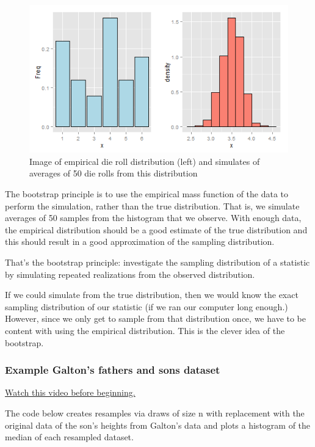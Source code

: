 \documentclass[]{article}
\begin{document}
\begin{figure}[htbp]
\centering
\includegraphics{LeanPub/images/bootstrapping2-1.png}
\caption{Image of empirical die roll distribution (left) and simulates
of averages of 50 die rolls from this distribution}
\end{figure}

The bootstrap principle is to use the empirical mass function of the
data to perform the simulation, rather than the true distribution. That
is, we simulate averages of 50 samples from the histogram that we
observe. With enough data, the empirical distribution should be a good
estimate of the true distribution and this should result in a good
approximation of the sampling distribution.

That's the bootstrap principle: investigate the sampling distribution of
a statistic by simulating repeated realizations from the observed
distribution.

If we could simulate from the true distribution, then we would know the
exact sampling distribution of our statistic (if we ran our computer
long enough.) However, since we only get to sample from that
distribution once, we have to be content with using the empirical
distribution. This is the clever idea of the bootstrap.

\subsubsection{Example Galton's fathers and sons
dataset}\label{example-galtons-fathers-and-sons-dataset}

\href{http://youtu.be/yNTWcmbWvWg?list=PLpl-gQkQivXiBmGyzLrUjzsblmQsLtkzJ}{Watch
this video before beginning.}

The code below creates resamples via draws of size n with replacement
with the original data of the son's heights from Galton's data and plots
a histogram of the median of each resampled dataset.
\end{document}
